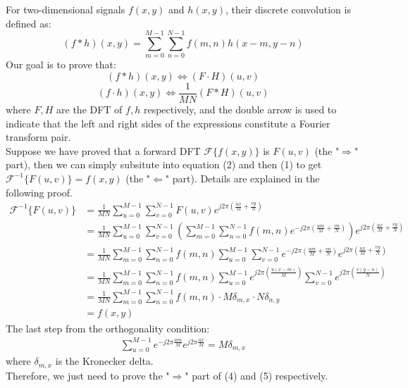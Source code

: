 \documentclass[UTF8]{ctexart}
\begin{document}
For two-dimensional signals \( f(x, y) \) and \( h(x, y) \), their discrete convolution is defined as:
\begin{equation}
    (f * h)(x, y) = \sum_{m=0}^{M-1} \sum_{n=0}^{N-1} f(m, n) h(x-m, y-n)
\end{equation}
Our goal is to prove that:\\
\begin{equation}
    (f * h)(x, y) \Leftrightarrow  (F \cdot H)(u, v)
\end{equation}
\begin{equation}
    (f \cdot h)(x, y) \Leftrightarrow \frac{1}{MN}(F * H)(u, v)
\end{equation}
where $F,H$ are the DFT of $f,h$ respectively, and the double arrow is used to indicate that the left and right sides of the expressions constitute a Fourier transform pair.\\
Suppose we have proved that a forward DFT $\mathcal{F}\{f(x,y)\}$ is $F(u,v)$ (the "$\Rightarrow$" part), then we can simply subsitute into equation (2) and then (1) to get
$\mathcal{F}^{-1}\{F(u,v)\} = f(x,y)$ (the "$\Leftarrow$" part). Details are explained in the following proof.\\
\begin{equation*}
    \begin{aligned}
    \mathcal{F}^{-1}\{F(u,v)\} &= \frac{1}{MN} \sum_{u=0}^{M-1} \sum_{v=0}^{N-1} F(u, v) e^{j2\pi \left( \frac{ux}{M} + \frac{vy}{N} \right)} \\
    &= \frac{1}{MN} \sum_{u=0}^{M-1} \sum_{v=0}^{N-1} \left( \sum_{m=0}^{M-1} \sum_{n=0}^{N-1} f(m, n) e^{-j2\pi \left( \frac{um}{M} + \frac{vn}{N} \right)} \right) e^{j2\pi \left( \frac{ux}{M} + \frac{vy}{N} \right)} \\
    &= \frac{1}{MN} \sum_{m=0}^{M-1} \sum_{n=0}^{N-1} f(m, n) \sum_{u=0}^{M-1} \sum_{v=0}^{N-1} e^{-j2\pi \left( \frac{um}{M} + \frac{vn}{N} \right)} e^{j2\pi \left( \frac{ux}{M} + \frac{vy}{N} \right)} \\
    &= \frac{1}{MN} \sum_{m=0}^{M-1} \sum_{n=0}^{N-1} f(m, n) \sum_{u=0}^{M-1} e^{j2\pi \left( \frac{u(x-m)}{M}\right)} \sum_{v=0}^{N-1} e^{j2\pi \left( \frac{v(y-n)}{N} \right)} \\
    &= \frac{1}{MN} \sum_{m=0}^{M-1} \sum_{n=0}^{N-1} f(m, n) \cdot M \delta_{m,x} \cdot N \delta_{n,y} \\
    &= f(x,y)
    \end{aligned}
\end{equation*}
The last step from the orthogonality condition:\\
\begin{equation*}
    \begin{aligned}
        \sum_{u=0}^{M-1} e^{-j2\pi \frac{um}{M} } e^{j2\pi  \frac{ux}{M} } = M \delta_{m,x}
    \end{aligned}
\end{equation*}
where $\delta_{m,x}$ is the Kronecker delta.\\
Therefore, we just need to prove the "$\Rightarrow$" part of (4) and (5) respectively.
\end{document}
